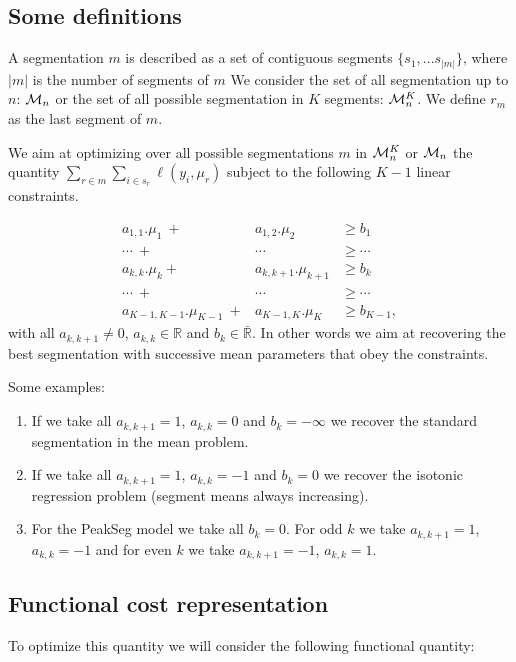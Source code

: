 \documentclass{article}
\begin{document}
\subsection{Some definitions}

A segmentation $m$ is described as a set of contiguous segments $\{s_1, ... s_{|m|} \}$, where $|m|$ is the number of segments of $m$
We consider the set of all segmentation up to $n$: $\mathcal{M}_n$ 
or the set of all possible segmentation in $K$ segments: $\mathcal{M}^K_n$.
We define $r_m$ as the last segment of $m$.

We aim at optimizing over all possible segmentations $m$ in $\mathcal{M}^K_n$ or $\mathcal{M}_n$
 the quantity
$\sum_{r \in m} \sum_{i \in s_{r}} \ell(y_i, \mu_{r})$ subject to
the following $K-1$ linear constraints. 

\begin{eqnarray*}
a_{1,1}.\mu_1 \ + & a_{1,2}.\mu_2  & \geq  b_1 \\
\cdots \ +&  \cdots & \geq \cdots \\
a_{k,k}.\mu_{k} + & a_{k,k+1}.\mu_{k+1}  & \geq  b_{k} \\
\cdots \ +&  \cdots & \geq \cdots  \\
a_{K-1,K-1}.\mu_{K-1} \ +& a_{K-1,K}.\mu_K & \geq  b_{K-1},
\end{eqnarray*}
with all $a_{k,k+1} \neq 0$, $a_{k,k} \in \mathbb{R}$ and
$b_{k} \in \bar{\mathbb{R}}.$ In other words we aim at recovering the
best segmentation with successive mean parameters that obey the
constraints.

Some examples:
\begin{enumerate}
\item If we take all $a_{k,k+1} =1$, $a_{k,k}=0$ and $b_{k} = - \infty$ we recover the standard segmentation in the mean problem.
\item If we take all $a_{k,k+1} =1$, $a_{k,k}=-1$ and $b_{k} = 0$ we
  recover the isotonic regression problem (segment means always
  increasing).
\item For the PeakSeg model we take all $b_{k} = 0$. For odd $k$ we
  take $a_{k,k+1} =1$, $a_{k,k}=-1$ and for even $k$ we take
  $a_{k,k+1} =-1$, $a_{k,k}=1$.
\end{enumerate}

\subsection{Functional cost representation}
To optimize this quantity we will consider the following functional quantity:
\end{document}

